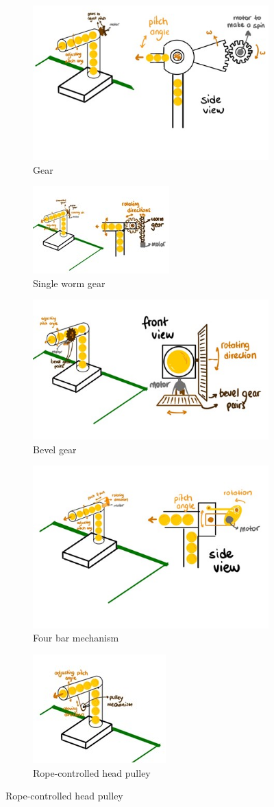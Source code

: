 \documentclass[12pt]{article}
\begin{document}
\begin{figure}[H]
\centering
\begin{subfigure}{.5\textwidth}
  \centering
  \includegraphics[width=.4\linewidth]{gearpitch.jpg}
  \caption{Gear}
  \label{fig:gear}
\end{subfigure}%
\begin{subfigure}{.5\textwidth}
  \centering
  \includegraphics[width=.4\linewidth]{wormpitch.jpg}
  \caption{Single worm gear}
  \label{fig:worm}
\end{subfigure}
\begin{subfigure}{.5\textwidth}
  \centering
  \includegraphics[width=.4\linewidth]{bevelpitch.jpg}
  \caption{Bevel gear}
  \label{fig:bevel}
\end{subfigure}%
\begin{subfigure}{.5\textwidth}
  \centering
  \includegraphics[width=.4\linewidth]{fourbarpitch.jpg}
  \caption{Four bar mechanism}
  \label{fig:fourbar}
\end{subfigure}%

\begin{subfigure}{.5\textwidth}
  \centering
  \includegraphics[width=.4\linewidth]{ropecontrol.jpg}
  \caption{Rope-controlled head pulley}
  \label{fig:rope}
\end{subfigure}%


\end{figure}
\end{document}
